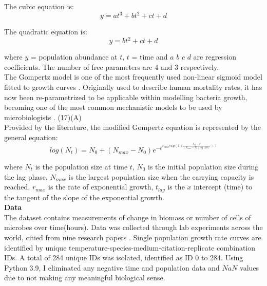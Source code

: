 \documentclass[11pt]{article}
\begin{document}
The cubic equation is: \\
    \begin{equation}
    y = at^3 + bt^2 + ct + d 
    \end{equation}

The quadratic equation is: \\
    \begin{equation}
    y = bt^2 + ct + d 
    \end{equation}

\noindent where $y$ = population abundance at $t$, $t$ = time and $a$ $b$ $c$ $d$ are regression coefficients. The number of free 
parameters are 4 and 3 respectively. \\

The Gompertz model is one of the most frequently used non-linear sigmoid model fitted to growth curves \cite{gompertz_xxiv_1825}. 
Originally used to describe human mortality rates, it has now been re-parametrized to be applicable within 
modelling bacteria growth, becoming one of the most common mechanistic models to be used by microbiologists \cite{tjorve_use_2017,gibson_predicting_1988}.
(17)(A) \\

Provided by the literature, the modified Gompertz equation is represented by the general equation: \\
    \begin{equation}    
    log(N_{t}) = N_{0} + (N_{max} - N_{0})e^{-e}^{r_{max}exp(1)\frac{t_{lag}-t}{(N_{max} - N_{0})log(10)}+1}
    \end{equation}
   
\noindent where $N_{t}$ is the population size at time $t$, $N_{0}$ is the initial population size during the lag phase,
$N_{max}$ is the largest population size when the carrying capacity is reached, $r_{max}$ is the rate of exponential growth,
$t_{lag}$ is the $x$ intercept (time) to the tangent of the slope of the exponential growth. \\ 

\noindent\textbf{Data} \\

The dataset contains measurements of change in biomass or number of cells of microbes over time(hours). Data was collected 
through lab experiments across the world, citied from nine research papers \cite{bae_growth_2014,bernhardt_metabolic_2018,roth_wheaton_1962,galarz_predicting_2016,gill_growth_1991,silva_modelling_2018,sivonen_effects_1990,stannard_temperaturegrowth_1985,zwietering_modeling_1994}.
Single population growth rate curves are identified by unique temperature-species-medium-citation-replicate combination IDs. A total of 284 
unique IDs was isolated, identified as ID 0 to 284. Using Python 3.9, I eliminated any negative time and population 
data and $NaN$ values due to not making any meaningful biological sense.\\
\end{document}
